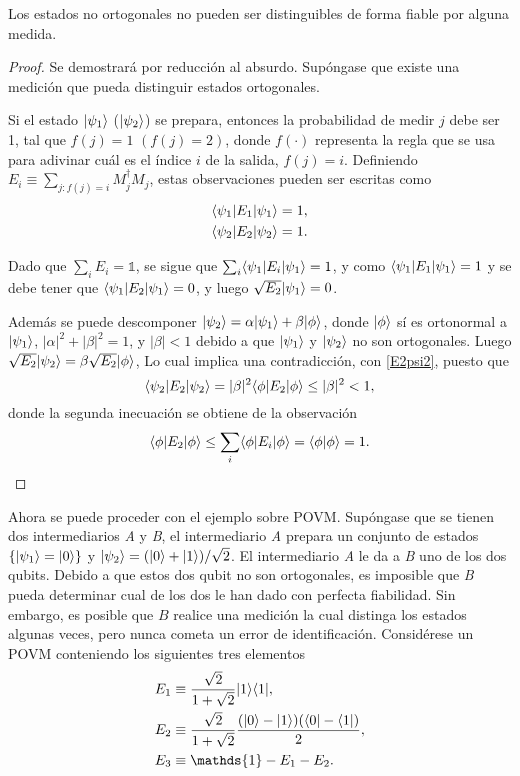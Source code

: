\begin{proposition}
Los estados no ortogonales no pueden ser distinguibles de forma fiable por alguna medida.
\end{proposition}
\begin{proof}
Se demostrará por reducción al absurdo. Supóngase que existe una medición que
pueda distinguir estados ortogonales.

Si el estado $|\psi_1\rangle $ ($|\psi_2\rangle $) se prepara, entonces la
probabilidad de medir $j$ debe ser 1, tal que  $f(j) =1$ $(f(j)=2)$, donde $f(\cdot)$ representa
la regla que se usa para adivinar cuál es el índice $i$ de la salida, $f(j)=i$. 
Definiendo $E_i\equiv \sum_{j:f(j)=i}M_j^\dagger M_j$, estas observaciones pueden ser escritas como 
\begin{align}
	\langle \psi_1|E_1|\psi_1\rangle=1, \label{E1psi1} \\
	\langle \psi_2|E_2|\psi_2\rangle=1\label{E2psi2}.
\end{align}

Dado que $\sum_i E_i=\mathds{1}$, se sigue que $\sum_i \langle \psi_1|E_i|\psi_1\rangle=1$,
y como $\langle \psi_1|E_1|\psi_1\rangle=1$ y se debe tener que $\langle \psi_1|E_2|\psi_1\rangle=0$,
y luego $\sqrt{E_2}|\psi_1\rangle=0$. 


Además se puede descomponer  
$|\psi_2\rangle=\alpha|\psi_1\rangle +\beta|\phi\rangle$, donde $|\phi\rangle$ sí es ortonormal
a $|\psi_1\rangle $, $|\alpha|^2+|\beta|^2=1$, y $|\beta|<1$ debido a que $|\psi_1\rangle$
y $|\psi_2\rangle$ no son ortogonales. Luego $\sqrt{E_2}|\psi_2\rangle=\beta \sqrt{E_2}|\phi\rangle$, Lo
cual implica una contradicción, con {\ref{E2psi2}}, puesto que \begin{equation}
	\langle \psi_2|E_2|\psi_2\rangle=|\beta|^2 \langle\phi|E_2|\phi\rangle \le |\beta|^2<1,
\end{equation} 
donde la segunda inecuación se obtiene de la observación \[ \langle \phi|E_2|\phi\rangle \le \sum_i\langle \phi|E_i|\phi\rangle= \langle\phi|\phi\rangle=1. \]
\end{proof}
Ahora se puede proceder con el ejemplo sobre POVM\@. Supóngase que se tienen
dos intermediarios \textit{A} y \textit{B}, el intermediario \textit{A} prepara
un conjunto de estados $\{|\psi_1\rangle=|0\rangle\}$ y $|\psi_2\rangle=(|0\rangle
+|1\rangle)/\sqrt{2}$. El intermediario \textit{A} le da a \textit{B} uno de los
dos qubits. Debido a que estos dos qubit no son ortogonales, es imposible que
\textit{B} pueda determinar cual de los dos le han dado con perfecta
fiabilidad. Sin embargo, es posible que $B$ realice una medición la cual
distinga los estados algunas veces, pero nunca cometa un error de
identificación. Considérese un POVM conteniendo los siguientes tres elementos 
	\begin{align}
		E_1 & \equiv \dfrac{\sqrt{2}}{1+\sqrt{2}} |1\rala1|, \label{eq11} \\
		E_2 & \equiv \dfrac{\sqrt{2}}{1+\sqrt{2}} \dfrac{(|0\ra -|1\ra)(\la0|-\la1|)}{2}, \label{eq12} \\
		E_3 & \equiv \mathds{1}-E_1-E_2\label{eq13}. 
	\end{align}

